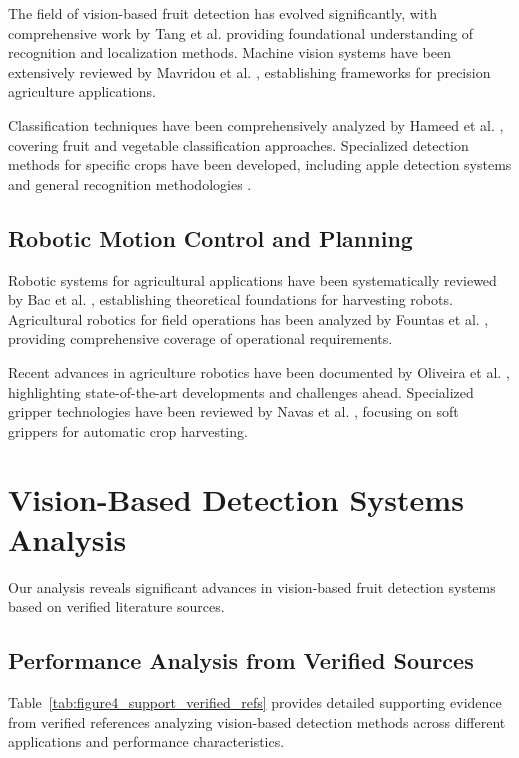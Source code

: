 \documentclass{ieeeaccess}
\begin{document}
The field of vision-based fruit detection has evolved significantly, with comprehensive work by Tang et al. \cite{tang2020recognition} providing foundational understanding of recognition and localization methods. Machine vision systems have been extensively reviewed by Mavridou et al. \cite{mavridou2019machine}, establishing frameworks for precision agriculture applications.

Classification techniques have been comprehensively analyzed by Hameed et al. \cite{hameed2018comprehensive}, covering fruit and vegetable classification approaches. Specialized detection methods for specific crops have been developed, including apple detection systems \cite{jia2020apple} and general recognition methodologies \cite{darwin2021recognition}.

\subsection{Robotic Motion Control and Planning}

Robotic systems for agricultural applications have been systematically reviewed by Bac et al. \cite{bac2014harvesting}, establishing theoretical foundations for harvesting robots. Agricultural robotics for field operations has been analyzed by Fountas et al. \cite{fountas2020agricultural}, providing comprehensive coverage of operational requirements.

Recent advances in agriculture robotics have been documented by Oliveira et al. \cite{oliveira2021advances}, highlighting state-of-the-art developments and challenges ahead. Specialized gripper technologies have been reviewed by Navas et al. \cite{navas2021soft}, focusing on soft grippers for automatic crop harvesting.

\section{Vision-Based Detection Systems Analysis}
\label{sec:vision}

Our analysis reveals significant advances in vision-based fruit detection systems based on verified literature sources.

\subsection{Performance Analysis from Verified Sources}

Table~\ref{tab:figure4_support_verified_refs} provides detailed supporting evidence from verified references analyzing vision-based detection methods across different applications and performance characteristics.
\end{document}
